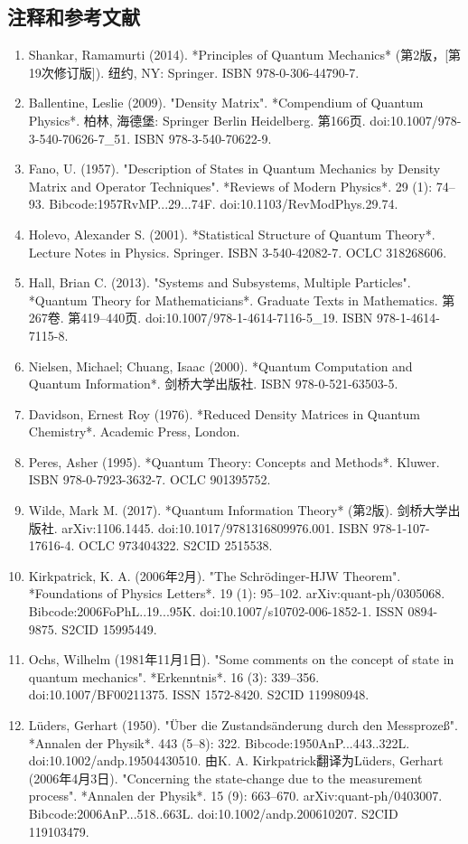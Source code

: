\subsection{注释和参考文献 } 
\begin{enumerate}
\item Shankar, Ramamurti (2014). *Principles of Quantum Mechanics* (第2版，[第19次修订版]). 纽约, NY: Springer. ISBN 978-0-306-44790-7.  
\item Ballentine, Leslie (2009). "Density Matrix". *Compendium of Quantum Physics*. 柏林, 海德堡: Springer Berlin Heidelberg. 第166页. doi:10.1007/978-3-540-70626-7_51. ISBN 978-3-540-70622-9.  
\item Fano, U. (1957). "Description of States in Quantum Mechanics by Density Matrix and Operator Techniques". *Reviews of Modern Physics*. 29 (1): 74–93. Bibcode:1957RvMP...29...74F. doi:10.1103/RevModPhys.29.74.  
\item Holevo, Alexander S. (2001). *Statistical Structure of Quantum Theory*. Lecture Notes in Physics. Springer. ISBN 3-540-42082-7. OCLC 318268606.  
\item Hall, Brian C. (2013). "Systems and Subsystems, Multiple Particles". *Quantum Theory for Mathematicians*. Graduate Texts in Mathematics. 第267卷. 第419–440页. doi:10.1007/978-1-4614-7116-5_19. ISBN 978-1-4614-7115-8.  
\item Nielsen, Michael; Chuang, Isaac (2000). *Quantum Computation and Quantum Information*. 剑桥大学出版社. ISBN 978-0-521-63503-5.  
\item Davidson, Ernest Roy (1976). *Reduced Density Matrices in Quantum Chemistry*. Academic Press, London.  
\item Peres, Asher (1995). *Quantum Theory: Concepts and Methods*. Kluwer. ISBN 978-0-7923-3632-7. OCLC 901395752.  
\item Wilde, Mark M. (2017). *Quantum Information Theory* (第2版). 剑桥大学出版社. arXiv:1106.1445. doi:10.1017/9781316809976.001. ISBN 978-1-107-17616-4. OCLC 973404322. S2CID 2515538.  
\item Kirkpatrick, K. A. (2006年2月). "The Schrödinger-HJW Theorem". *Foundations of Physics Letters*. 19 (1): 95–102. arXiv:quant-ph/0305068. Bibcode:2006FoPhL..19...95K. doi:10.1007/s10702-006-1852-1. ISSN 0894-9875. S2CID 15995449.
\item Ochs, Wilhelm (1981年11月1日). "Some comments on the concept of state in quantum mechanics". *Erkenntnis*. 16 (3): 339–356. doi:10.1007/BF00211375. ISSN 1572-8420. S2CID 119980948.  
\item Lüders, Gerhart (1950). "Über die Zustandsänderung durch den Messprozeß". *Annalen der Physik*. 443 (5–8): 322. Bibcode:1950AnP...443..322L. doi:10.1002/andp.19504430510. 由K. A. Kirkpatrick翻译为Lüders, Gerhart (2006年4月3日). "Concerning the state-change due to the measurement process". *Annalen der Physik*. 15 (9): 663–670. arXiv:quant-ph/0403007. Bibcode:2006AnP...518..663L. doi:10.1002/andp.200610207. S2CID 119103479.  

\end{enumerate}
